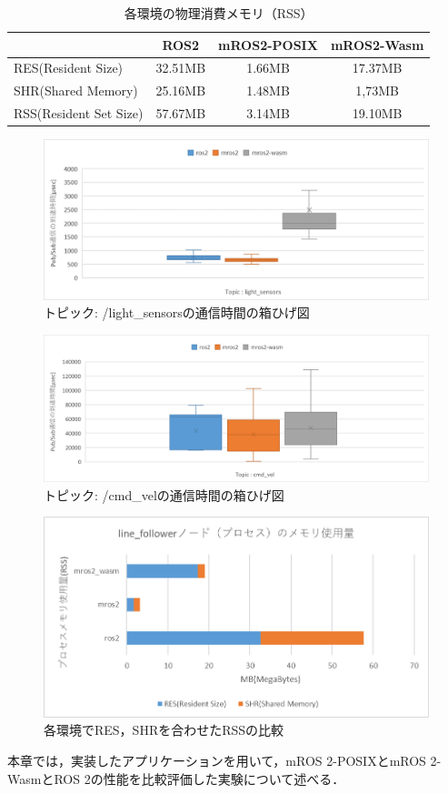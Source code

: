 \begin{table}[ht]
  \centering
  \begin{tabular}{|l|c|c|c|}
  \hline
   & ROS2 & mROS2-POSIX & mROS2-Wasm \\ \hline
  RES(Resident Size) & 32.51MB & 1.66MB & 17.37MB \\ \hline
  SHR(Shared Memory) & 25.16MB & 1.48MB & 1,73MB \\ \hline
  RSS(Resident Set Size) & 57.67MB & 3.14MB & 19.10MB \\ \hline
  \end{tabular}
  \caption{各環境の物理消費メモリ（RSS）}
  \label{tab:rss_stats}
\end{table}

\begin{figure}[ht]
  \centering
  \includegraphics[width=15cm]{images/fig6_lightsensors.png}
  \caption{トピック: /light\_sensorsの通信時間の箱ひげ図}
  \label{fig:light_sensors}
\end{figure}
\begin{figure}[ht]
  \centering
  \includegraphics[width=15cm]{images/fig6_cmdvel.png}
  \caption{トピック: /cmd\_velの通信時間の箱ひげ図}
  \label{fig:cmd_vel}
\end{figure}
\begin{figure}[ht]
  \centering
  \includegraphics[width=15cm]{images/fig6_memory_v2.png}
  \caption{各環境でRES，SHRを合わせたRSSの比較}
  \label{fig:allmemory}
\end{figure}
本章では，実装したアプリケーションを用いて，mROS 2-POSIXとmROS 2-WasmとROS 2の性能を比較評価した実験について述べる．
